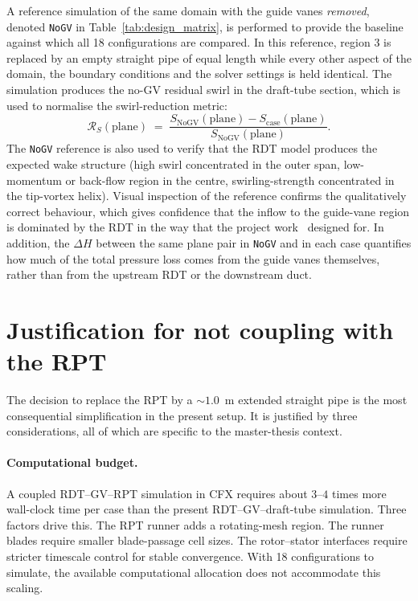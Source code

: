 A reference simulation of the same domain with the guide vanes \emph{removed}, denoted \texttt{NoGV} in Table~\ref{tab:design_matrix}, is performed to provide the baseline against which all 18 configurations are compared. In this reference, region 3 is replaced by an empty straight pipe of equal length while every other aspect of the domain, the boundary conditions and the solver settings is held identical. The simulation produces the no-GV residual swirl in the draft-tube section, which is used to normalise the swirl-reduction metric:
\begin{equation}
\mathcal{R}_S(\mathrm{plane}) \;=\; \frac{S_{\mathrm{NoGV}}(\mathrm{plane}) - S_{\mathrm{case}}(\mathrm{plane})}{S_{\mathrm{NoGV}}(\mathrm{plane})}.
\label{eq:swirl_reduction}
\end{equation}
The \texttt{NoGV} reference is also used to verify that the RDT model produces the expected wake structure (high swirl concentrated in the outer span, low-momentum or back-flow region in the centre, swirling-strength concentrated in the tip-vortex helix). Visual inspection of the reference confirms the qualitatively correct behaviour, which gives confidence that the inflow to the guide-vane region is dominated by the RDT in the way that the project work~\cite{Leonsen2025} designed for. In addition, the $\Delta H$ between the same plane pair in \texttt{NoGV} and in each case quantifies how much of the total pressure loss comes from the guide vanes themselves, rather than from the upstream RDT or the downstream duct.
 
\section{Justification for not coupling with the RPT}
\label{sec:rpt-decoupling-justification}
 
The decision to replace the RPT by a $\sim 1.0$~m extended straight pipe is the most consequential simplification in the present setup. It is justified by three considerations, all of which are specific to the master-thesis context.
 
\paragraph{Computational budget.} A coupled RDT--GV--RPT simulation in CFX requires about $3$--$4$ times more wall-clock time per case than the present RDT--GV--draft-tube simulation. Three factors drive this. The RPT runner adds a rotating-mesh region. The runner blades require smaller blade-passage cell sizes. The rotor--stator interfaces require stricter timescale control for stable convergence. With 18 configurations to simulate, the available computational allocation does not accommodate this scaling.
 
